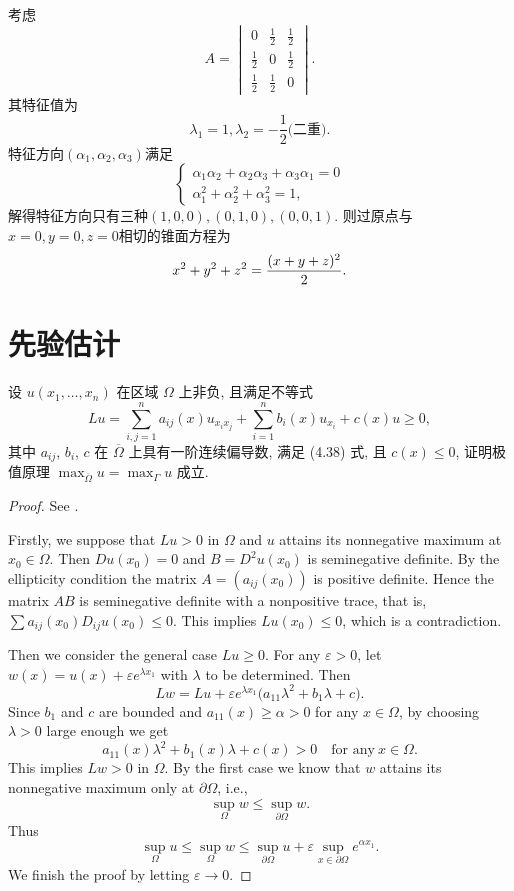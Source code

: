 \begin{solve}
	考虑
	$$A=\begin{vmatrix}
		0&\frac{1}{2}&\frac{1}{2}\\
		\frac{1}{2}&0&\frac{1}{2}\\
		\frac{1}{2}&\frac{1}{2}&0
	\end{vmatrix}.$$
	其特征值为
	$$\lambda_1=1,\lambda_2=-\frac{1}{2}\text{(二重)}.$$
	特征方向$(\alpha_1,\alpha_2,\alpha_3)$满足
	$$\begin{cases}
		\alpha_1\alpha_2+\alpha_2\alpha_3+\alpha_3\alpha_1=0\\
		\alpha_1^2+\alpha_2^2+\alpha_3^2=1,
	\end{cases}$$
	解得特征方向只有三种$(1,0,0),(0,1,0),(0,0,1)$. 则过原点与$x=0,y=0,z=0$相切的锥面方程为
	\[x^2+y^2+z^2=\frac{(x+y+z)^2}2.\qedhere\]
\end{solve}
\section{先验估计}

\begin{exercise}[2]
  设 $u(x_1,\ldots,x_n)$ 在区域 $\Omega$ 上非负, 且满足不等式
  \[Lu = \sum_{i,j=1}^n a_{ij}(x) u_{x_ix_j} + \sum_{i=1}^n b_i(x) u_{x_i} + c(x)u\geq 0,\]
  其中 $a_{ij}$, $b_i$, $c$ 在 $\overline{\Omega}$ 上具有一阶连续偏导数,
  满足 (4.38) 式, 且 $c(x)\leq 0$,
  证明极值原理 $\max_{\overline{\Omega}}u=\max_{\Gamma}u$ 成立.
\end{exercise}

\begin{proof}
  See \cite[Lemma~2.1 \& Theorem~2.3]{han_elliptic_2011}.

  Firstly, we suppose that $Lu >0$ in $\Omega$ and $u$ attains its nonnegative
  maximum at $x_0\in\Omega$. Then $Du(x_0) = 0$ and $B = D^2u(x_0)$
  is seminegative definite. By the ellipticity condition
  the matrix $A = (a_{ij}(x_0))$ is positive definite.
  Hence the matrix $AB$ is seminegative definite with a nonpositive trace,
  that is, $\sum a_{ij}(x_0) D_{ij}u(x_0)\leq 0$. This implies $Lu(x_0)\leq 0$,
  which is a contradiction.

  Then we consider the general case $Lu\geq 0$.
  For any $\varepsilon>0$, let $w(x) = u(x) + \varepsilon e^{\lambda x_1}$ with $\lambda$
  to be determined. Then
  \[ Lw = Lu + \varepsilon e^{\lambda x_1} \bigl(a_{11}\lambda^2
      + b_1\lambda +c\bigr). \]
  Since $b_1$ and $c$ are bounded and $a_{11}(x)\geq\alpha>0$
  for any $x\in\Omega$, by choosing $\lambda>0$ large enough
  we get
  \[ a_{11}(x)\lambda^2 + b_1(x)\lambda + c(x) >0 \quad \text{for any}\ x\in\Omega.\]
  This implies $Lw>0$ in $\Omega$. By the first case we know that
  $w$ attains its nonnegative maximum only at $\partial\Omega$, i.e.,
  \[ \sup_{\Omega} w \leq \sup_{\partial\Omega} w. \]
  Thus
  \[ \sup_{\Omega} u \leq \sup_{\Omega} w
      \leq \sup_{\partial\Omega} u
        + \varepsilon \sup_{x\in\partial\Omega} e^{\alpha x_1}. \]
  We finish the proof by letting $\varepsilon\to 0$.
\end{proof}


